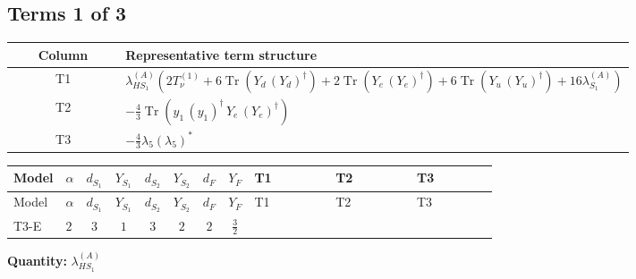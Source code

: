 \documentclass[8pt]{article}
\begin{document}
\begin{landscape}
\subsection*{Terms 1 of 3}
\begin{center}
\begin{tabular}{@{}c >{\raggedright\arraybackslash}p{0.82\linewidth}@{}}
\toprule
Column & Representative term structure \\
\midrule
T1 & \(\displaystyle {\lambda_{HS_1}^{(A)}} (2 T_{\nu}^{(1)}+6 \operatorname{Tr}\!\left({Y_d}\,\left({Y_d}\right)^{\dagger}\right)+2 \operatorname{Tr}\!\left({Y_e}\,\left({Y_e}\right)^{\dagger}\right)+6 \operatorname{Tr}\!\left({Y_u}\,\left({Y_u}\right)^{\dagger}\right)+16 {\lambda_{S_1}^{(A)}})\) \\
\midrule
T2 & \(\displaystyle -\frac{4}{3} \operatorname{Tr}\!\left({y_1}\,\left({y_1}\right)^{\dagger}\,{Y_e}\,\left({Y_e}\right)^{\dagger}\right)\) \\
\midrule
T3 & \(\displaystyle -\frac{4}{3} {\lambda_5} \left({\lambda_5}\right)^{*}\) \\
\midrule
\bottomrule
\end{tabular}
\end{center}
\smallskip
\tiny
\begin{longtable}{@{}llcccccc >{\raggedright\arraybackslash}p{0.21\linewidth} >{\raggedright\arraybackslash}p{0.21\linewidth} >{\raggedright\arraybackslash}p{0.21\linewidth}@{}}
\toprule
Model & $\alpha$ & $d_{S_1}$ & $Y_{S_1}$ & $d_{S_2}$ & $Y_{S_2}$ & $d_F$ & $Y_F$ & T1 & T2 & T3 \\
\midrule
\endfirsthead
\toprule
Model & $\alpha$ & $d_{S_1}$ & $Y_{S_1}$ & $d_{S_2}$ & $Y_{S_2}$ & $d_F$ & $Y_F$ & T1 & T2 & T3 \\
\midrule
\endhead
T3-E & $2$ & $3$ & $1$ & $3$ & $2$ & $2$ & $\frac{3}{2}$ & \scriptsize\adjustbox{max width=\linewidth}{$\begin{gathered} {\lambda_{HS_1}^{(A)}} (2 T_{\nu}^{(1)}+6 \operatorname{Tr}\!\left({Y_d}\,\left({Y_d}\right)^{\dagger}\right)+2 \operatorname{Tr}\!\left({Y_e}\,\left({Y_e}\right)^{\dagger}\right)+6 \operatorname{Tr}\!\left({Y_u}\,\left({Y_u}\right)^{\dagger}\right)+16 {\lambda_{S_1}^{(A)}})\end{gathered}$} & \scriptsize\adjustbox{max width=\linewidth}{$\begin{gathered} -\frac{4}{3} \operatorname{Tr}\!\left({y_1}\,\left({y_1}\right)^{\dagger}\,{Y_e}\,\left({Y_e}\right)^{\dagger}\right)\end{gathered}$} & \scriptsize\adjustbox{max width=\linewidth}{$\begin{gathered} -\frac{4}{3} {\lambda_5} \left({\lambda_5}\right)^{*}\end{gathered}$} \\
\midrule
\bottomrule
\end{longtable}
\clearpage
\noindent\textbf{Quantity: }$\lambda_{HS_1}^{(A)}$\par\smallskip

\end{landscape}
\end{document}
